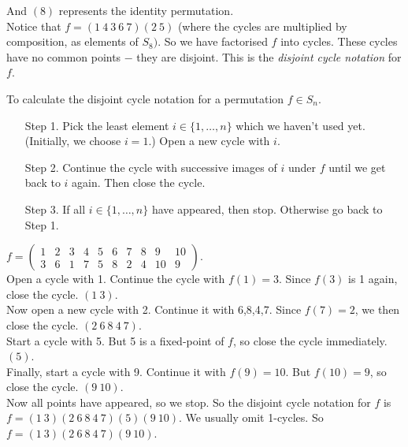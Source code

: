 \documentclass[twoside]{scrartcl}
\begin{document}
And $(8)$ represents the identity permutation.\\


Notice that $f =  (1~4~3~6~7)(2~5)$ (where the cycles are multiplied by composition, as elements of $S_8)$. So we have factorised $f$ into cycles. These cycles have no common points $-$ they are disjoint. This is the \emph{disjoint cycle notation} for $f$.\\


\begin{method}To calculate the disjoint cycle notation for a permutation $f \in S_n$.\begin{enumerate}

\item[Step 1.] Pick the least element $i \in \{1,\dots,n\}$ which  we haven't used yet. (Initially, we choose $i=1$.) Open a new cycle with $i$. 

\item[Step 2.] Continue the cycle with successive images of $i$ under $f$ until we get back to $i$ again. Then close the cycle.

\item[Step 3.] If all $i \in \{1,\dots,n\}$ have appeared, then stop. Otherwise go back to Step 1.

\end{enumerate}
\end{method}\vspace*{10pt}

\begin{examples}$f = \begin{pmatrix}
1 & 2 & 3 & 4 & 5 & 6 & 7 & 8 & 9 & 10\\
3 & 6 & 1 & 7 & 5 & 8 & 2 & 4 & 10 & 9	
\end{pmatrix}$. \\

Open a cycle with 1. Continue the cycle with $f(1) = 3$. Since $f(3)$ is 1 again, close the cycle. $(1~3)$. \\

Now open a new cycle with 2. Continue it with 6,8,4,7. Since $f(7) = 2$, we then close the cycle. $(2~6~8~4~7)$. \\

Start a cycle with 5. But 5 is a fixed-point of $f$, so close the cycle immediately. $(5)$.\\

Finally, start a cycle with 9. Continue it with $f(9) = 10$. But $f(10) = 9$, so close the cycle. $(9~10)$.\\

Now all points have appeared, so we stop. So the disjoint cycle notation for $f$ is $f = (1~3)(2~6~8~4~7)(5)(9~10)$. We usually omit 1-cycles. So $f = (1~3)(2~6~8~4~7)(9~10)$.
\end{examples}\vspace*{10pt}
\end{document}
